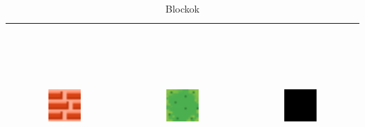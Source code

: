 \begin{table}[h!]
    \begin{center}
    \begin{tabular}{ | c | c | c | }
    \hline
    \includegraphics[width=0.3\textwidth, height=60mm]{images/block_brick.png}
    & 
    \includegraphics[width=0.3\textwidth, height=60mm]{images/block_grass.png}    
    & 
    \includegraphics[width=0.3\textwidth, height=60mm]{images/block_empty.png}
    \\
    \hline
    \end{tabular}
    \caption{Blockok}
    \label{tbl:Blocks}
    \end{center}
\end{table}

